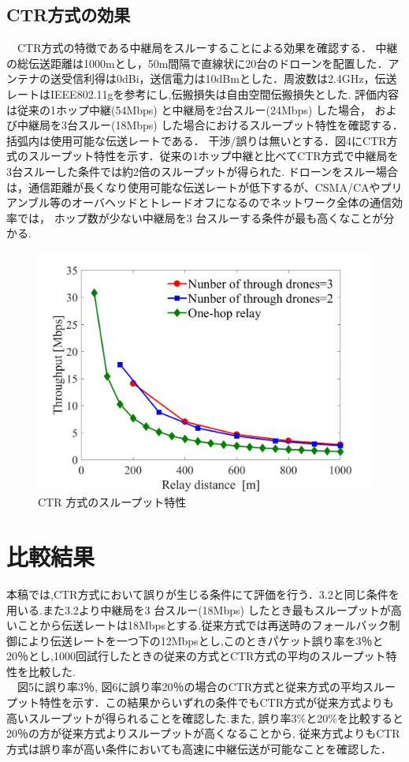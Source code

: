 \documentclass[a4paper,10pt]{ltjsarticle}
\begin{document}
\subsection{CTR方式の効果}
　CTR方式の特徴である中継局をスルーすることによる効果を確認する．
中継の総伝送距離は1000mとし，50m間隔で直線状に20台のドローンを配置した．アンテナの送受信利得は0dBi，送信電力は10dBmとした．周波数は2.4GHz，伝送レートはIEEE802.11gを参考にし,伝搬損失は自由空間伝搬損失とした.
評価内容は従来の1ホップ中継(54Mbps) と中継局を2台スルー(24Mbps) した場合，
および中継局を3台スルー(18Mbps) した場合におけるスループット特性を確認する．括弧内は使用可能な伝送レートである．
干渉/誤りは無いとする．図4にCTR方式のスループット特性を示す．従来の1ホップ中継と比べてCTR方式で中継局を3台スルーした条件では約2倍のスループットが得られた.
ドローンをスルー場合は，通信距離が長くなり使用可能な伝送レートが低下するが、CSMA/CAやプリアンブル等のオーバヘッドとトレードオフになるのでネットワーク全体の通信効率では，
ホップ数が少ない中継局を3 台スルーする条件が最も高くなことが分かる.
\begin{figure}[H]
  \centering
  \includegraphics[width=\linewidth]{throughtput_vs_placement_50m_max_distance_3.png} %
  \caption{CTR 方式のスループット特性}
  \label{fig:throughput_through} %
\end{figure}
\section{比較結果}
本稿では,CTR方式において誤りが生じる条件にて評価を行う．3.2と同じ条件を用いる.また3.2より中継局を3 台スルー(18Mbps) したとき最もスループットが高いことから伝送レートは18Mbpsとする.従来方式では再送時のフォールバック制御により伝送レートを一つ下の12Mbpsとし,このときパケット誤り率を3％と20％とし,1000回試行したときの従来の方式とCTR方式の平均のスループット特性を比較した.
\\　図5に誤り率3％, 図6に誤り率20％の場合のCTR方式と従来方式の平均スループット特性を示す．この結果からいずれの条件でもCTR方式が従来方式よりも高いスループットが得られることを確認した.また, 誤り率3\%と20\%を比較すると20％の方が従来方式よりスループットが高くなることから, 従来方式よりもCTR方式は誤り率が高い条件においても高速に中継伝送が可能なことを確認した．
\end{document}
